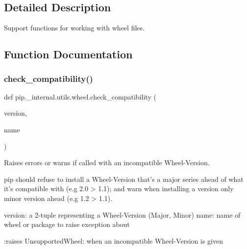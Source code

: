 \subsection{Detailed Description}
\begin{DoxyVerb}Support functions for working with wheel files.
\end{DoxyVerb}
 

\subsection{Function Documentation}
\mbox{\label{namespacepip_1_1__internal_1_1utils_1_1wheel_a2457b15ce9df17fc6fce59acf362bde7}} 
\subsubsection{\texorpdfstring{check\+\_\+compatibility()}{check\_compatibility()}}
{\footnotesize\ttfamily def pip.\+\_\+internal.\+utils.\+wheel.\+check\+\_\+compatibility (\begin{DoxyParamCaption}\item[{}]{version,  }\item[{}]{name }\end{DoxyParamCaption})}

\begin{DoxyVerb}Raises errors or warns if called with an incompatible Wheel-Version.

pip should refuse to install a Wheel-Version that's a major series
ahead of what it's compatible with (e.g 2.0 > 1.1); and warn when
installing a version only minor version ahead (e.g 1.2 > 1.1).

version: a 2-tuple representing a Wheel-Version (Major, Minor)
name: name of wheel or package to raise exception about

:raises UnsupportedWheel: when an incompatible Wheel-Version is given
\end{DoxyVerb}
 \mbox{\label{namespacepip_1_1__internal_1_1utils_1_1wheel_a5694f73c60d36a304f5b667b0c543f4b}} 
